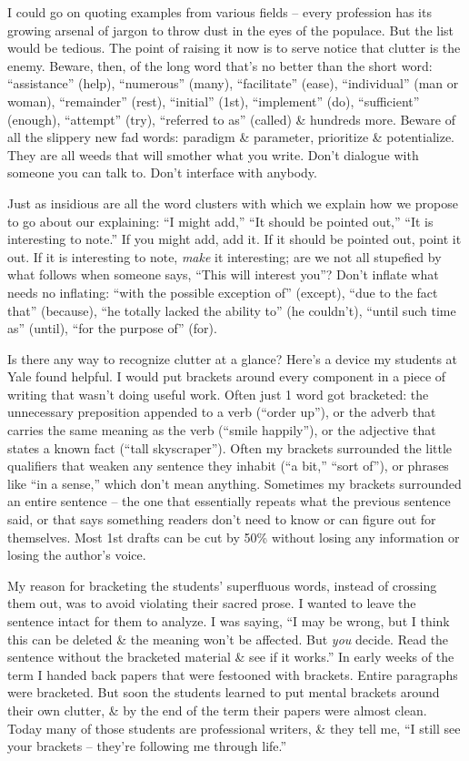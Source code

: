 \documentclass{article}
\begin{document}
I could go on quoting examples from various fields -- every profession has its growing arsenal of jargon to throw dust in the eyes of the populace. But the list would be tedious. The point of raising it now is to serve notice that clutter is the enemy. Beware, then, of the long word that's no better than the short word: ``assistance'' (help), ``numerous'' (many), ``facilitate'' (ease), ``individual'' (man or woman), ``remainder'' (rest), ``initial'' (1st), ``implement'' (do), ``sufficient'' (enough), ``attempt'' (try), ``referred to as'' (called) \& hundreds more. Beware of all the slippery new fad words: paradigm \& parameter, prioritize \& potentialize. They are all weeds that will smother what you write. Don't dialogue with someone you can talk to. Don't interface with anybody.

Just as insidious are all the word clusters with which we explain how we propose to go about our explaining: ``I might add,'' ``It should be pointed out,'' ``It is interesting to note.'' If you might add, add it. If it should be pointed out, point it out. If it is interesting to note, \textit{make} it interesting; are we not all stupefied by what follows when someone says, ``This will interest you''? Don't inflate what needs no inflating: ``with the possible exception of'' (except), ``due to the fact that'' (because), ``he totally lacked the ability to'' (he couldn't), ``until such time as'' (until), ``for the purpose of'' (for).

Is there any way to recognize clutter at a glance? Here's a device my students at Yale found helpful. I would put brackets around every component in a piece of writing that wasn't doing useful work. Often just 1 word got bracketed: the unnecessary preposition appended to a verb (``order up''), or the adverb that carries the same meaning as the verb (``smile happily''), or the adjective that states a known fact (``tall skyscraper''). Often my brackets surrounded the little qualifiers that weaken any sentence they inhabit (``a bit,'' ``sort of''), or phrases like ``in a sense,'' which don't mean anything. Sometimes my brackets surrounded an entire sentence -- the one that essentially repeats what the previous sentence said, or that says something readers don't  need to know or can figure out for themselves. Most 1st drafts can be cut by 50\% without losing any information or losing the author's voice.

My reason for bracketing the students' superfluous words, instead of crossing them out, was to avoid violating their sacred prose. I wanted to leave the sentence intact for them to analyze. I was saying, ``I may be wrong, but I think this can be deleted \& the meaning won't be affected. But \textit{you} decide. Read the sentence without the bracketed material \& see if it works.'' In early weeks of the term I handed back papers that were festooned with brackets. Entire paragraphs were bracketed. But soon the students learned to put mental brackets around their own clutter, \& by the end of the term their papers were almost clean. Today many of those students are professional writers, \& they tell me, ``I still see your brackets -- they're following me through life.''
\end{document}
